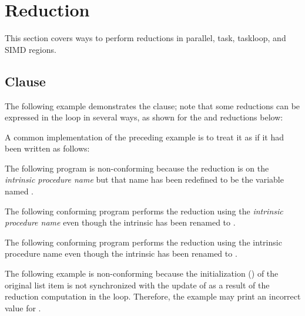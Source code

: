 \pagebreak

\section{Reduction}
\label{sec:reduction}

This section covers ways to perform reductions in parallel, task, taskloop, and SIMD regions.

\subsection{ Clause}
\label{subsec:reduction}

The following example demonstrates the  clause; note that some 
reductions can be expressed in the loop in several ways, as shown for the  
and  reductions below:


\pagebreak


A common implementation of the preceding example is to treat it as if it had been 
written as follows:


\begin{fortranspecific}

The following program is non-conforming because the reduction is on the 
\emph{intrinsic procedure name}  but that name has been redefined to be the variable 
named .


The following conforming program performs the reduction using the 
\emph{intrinsic procedure name}  even though the intrinsic
 has been renamed to .


The following conforming program performs the reduction using 
the intrinsic procedure name  even though the intrinsic 
has been renamed to .

\end{fortranspecific}

The following example is non-conforming because the initialization () of the original list item  is not synchronized with the update of 
 as a result of the reduction computation in the  loop. Therefore, 
the example may print an incorrect value for .

